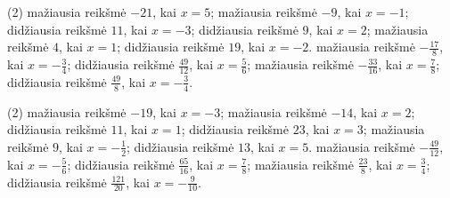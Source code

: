 \documentclass[11pt,a4paper]{scrartcl}
\begin{document}
\begin{problem} \phantom{text}
\begin{tasks}[label={(\arabic*)}, label-offset=0.9em](2)
	\task mažiausia reikšmė $-21$, kai $x=5$;
	\task mažiausia reikšmė $-9$, kai $x=-1$;
	\task didžiausia reikšmė $11$, kai $x=-3$;
	\task didžiausia reikšmė $9$, kai $x=2$;
	\task mažiausia reikšmė $4$, kai $x=1$;
	\task didžiausia reikšmė $19$, kai $x=-2$.
	\task mažiausia reikšmė $-\frac{17}{8}$, kai $x=-\frac{3}{4}$;
	\task didžiausia reikšmė $\frac{49}{12}$, kai $x=\frac{5}{6}$;
	\task mažiausia reikšmė $-\frac{33}{16}$, kai $x=\frac{7}{8}$;
	\task didžiausia reikšmė $\frac{49}{8}$, kai $x=-\frac{3}{4}$.
\end{tasks}
\end{problem}

\begin{problem} \phantom{text}
\begin{tasks}[label={(\arabic*)}, label-offset=0.9em](2)
	\task mažiausia reikšmė $-19$, kai $x=-3$;
	\task mažiausia reikšmė $-14$, kai $x=2$;
	\task didžiausia reikšmė $11$, kai $x=1$;
	\task didžiausia reikšmė $23$, kai $x=3$;
	\task mažiausia reikšmė $9$, kai $x=-\frac{1}{2}$;
	\task didžiausia reikšmė $13$, kai $x=5$.
	\task mažiausia reikšmė $-\frac{49}{12}$, kai $x=-\frac{5}{6}$;
	\task didžiausia reikšmė $\frac{65}{16}$, kai $x=\frac{7}{8}$;
	\task mažiausia reikšmė $\frac{23}{8}$, kai $x=\frac{3}{4}$;
	\task didžiausia reikšmė $\frac{121}{20}$, kai $x=-\frac{9}{10}$.
\end{tasks}
\end{problem}
\end{document}
